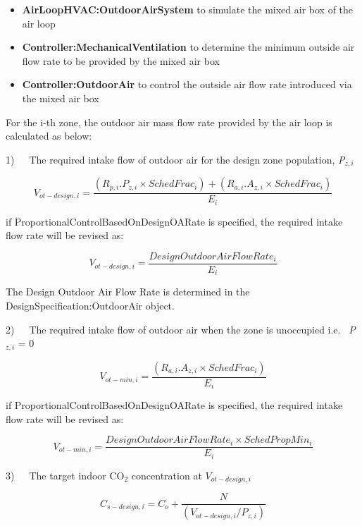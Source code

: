 \begin{itemize}
  \item \textbf{AirLoopHVAC:OutdoorAirSystem} to simulate the mixed air box of the air loop
  \item \textbf{Controller:MechanicalVentilation} to determine the minimum outside air flow rate to be provided by the mixed air box
  \item \textbf{Controller:OutdoorAir} to control the outside air flow rate introduced via the mixed air box
\end{itemize}

For the i-th zone, the outdoor air mass flow rate provided by the air loop is calculated as below:

1)~~~The required intake flow of outdoor air for the design zone population, \emph{P\(_{z,i}\)}

\begin{equation}
{V_{ot - design,i}} = \frac{{\left( {{R_{p,i}}.{P_{z,i}} \times {SchedFrac_i}} \right) + ({R_{a,i}}.{A_{z,i}} \times {SchedFrac_i})}}{{{E_i}}}
\end{equation}

if ProportionalControlBasedOnDesignOARate is specified, the required intake flow rate will be revised as:

 \begin{equation} {V_{ot - design,i}} = \frac{Design Outdoor Air Flow Rate_i} {E_i} \end{equation}

The Design Outdoor Air Flow Rate is determined in the DesignSpecification:OutdoorAir object. 

2)~~~The required intake flow of outdoor air when the zone is unoccupied i.e.~ \emph{P\(_{z,i}\)} = 0

\begin{equation}
{V_{ot - min,i}} = \frac{{({R_{a,i}}.{A_{z,i}} \times {SchedFrac_i})}}{{{E_i}}}
\end{equation}

if ProportionalControlBasedOnDesignOARate is specified, the required intake flow rate will be revised as:

 \begin{equation} {V_{ot - min,i}} = \frac{ {Design Outdoor Air Flow Rate_i} \times {SchedPropMin_i} } {E_i} \end{equation}


3)~~~The target indoor CO\(_{2}\) concentration at \({V_{ot - design,i}}\)

\begin{equation}
{C_{s - design,i}} = {C_o} + \frac{N}{{\left( {{V_{ot - design,i}}/{P_{z,i}}} \right)}}
\end{equation}

